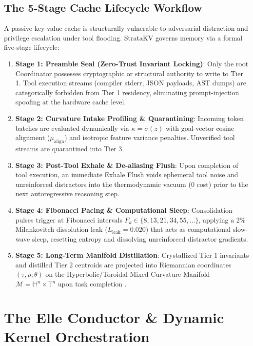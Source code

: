 \documentclass[11pt,letterpaper]{article}
\theoremstyle{definition}
\begin{document}
\subsection{The 5-Stage Cache Lifecycle Workflow}
A passive key-value cache is structurally vulnerable to adversarial distraction and privilege escalation under tool flooding. StrataKV governs memory via a formal five-stage lifecycle:
\begin{enumerate}
    \item \textbf{Stage 1: Preamble Seal (Zero-Trust Invariant Locking)}: Only the root Coordinator possesses cryptographic or structural authority to write to Tier 1. Tool execution streams (compiler stderr, JSON payloads, AST dumps) are categorically forbidden from Tier 1 residency, eliminating prompt-injection spoofing at the hardware cache level.
    \item \textbf{Stage 2: Curvature Intake Profiling \& Quarantining}: Incoming token batches are evaluated dynamically via $\kappa = \sigma(z)$ with goal-vector cosine alignment ($\mu_{\text{align}}$) and isotropic feature variance penalties. Unverified tool streams are quarantined into Tier 3.
    \item \textbf{Stage 3: Post-Tool Exhale \& De-aliasing Flush}: Upon completion of tool execution, an immediate Exhale Flush voids ephemeral tool noise and unreinforced distractors into the thermodynamic vacuum ($0$ cost) prior to the next autoregressive reasoning step.
    \item \textbf{Stage 4: Fibonacci Pacing \& Computational Sleep}: Consolidation pulses trigger at Fibonacci intervals $F_k \in \{8, 13, 21, 34, 55, \dots\}$, applying a 2\% Milankovitch dissolution leak ($L_{\text{leak}} = 0.020$) that acts as computational slow-wave sleep, resetting entropy and dissolving unreinforced distractor gradients.
    \item \textbf{Stage 5: Long-Term Manifold Distillation}: Crystallized Tier 1 invariants and distilled Tier 2 centroids are projected into Riemannian coordinates $(\tau, \rho, \theta)$ on the Hyperbolic/Toroidal Mixed Curvature Manifold $\mathcal{M} = \mathbb{H}^n \times \mathbb{T}^n$ upon task completion \cite{barteau2026atlas}.
\end{enumerate}

\section{The Elle Conductor \& Dynamic Kernel Orchestration}
\label{sec:conductor}
\end{document}
